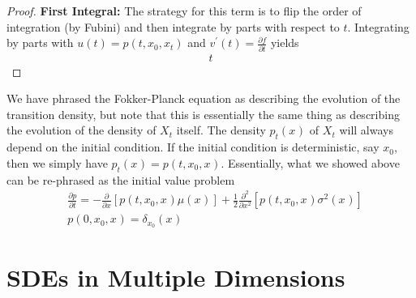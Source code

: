 \documentclass[12pt]{article}
\newcommand{\state}[1][t]{X_{#1}}
\newcommand{\stateValue}[1][t]{x_{#1}}
\begin{document}
\begin{proof}
\bigskip
\noindent
\textbf{First Integral:} The strategy for this term is to flip the order of integration (by Fubini) and then integrate by parts with respect to $t$. 
Integrating by parts with $u(t) = p(t, \stateValue[0], \stateValue)$ and $v^\prime(t) = \frac{\partial f}{\partial t}$ yields 
\begin{align*}
t
\end{align*}

\end{proof}

We have phrased the Fokker-Planck equation as describing the evolution of the transition density, but note that this is essentially the same thing as 
describing the evolution of the density of $\state$ itself. The density $p_t(\stateValue[])$ of $\state$ will always depend on the initial condition. If the initial condition is 
deterministic, say $\stateValue[0]$, then we simply have $p_t(\stateValue[]) = p(t, \stateValue[0], \stateValue[])$. Essentially, what we showed above can be re-phrased
as the initial value problem
\begin{align}
&\frac{\partial p}{\partial t} = -\frac{\partial}{\partial x} [p(t, \stateValue[0], \stateValue[])\mu(\stateValue[])] + \frac{1}{2} \frac{\partial^2}{\partial x^2} [p(t, \stateValue[0], \stateValue[]) \sigma^2(\stateValue[])] \\
&p(0, \stateValue[0], \stateValue[]) = \delta_{\stateValue[0]}(\stateValue[]) \nonumber
\end{align}

\section{SDEs in Multiple Dimensions}
\end{document}

